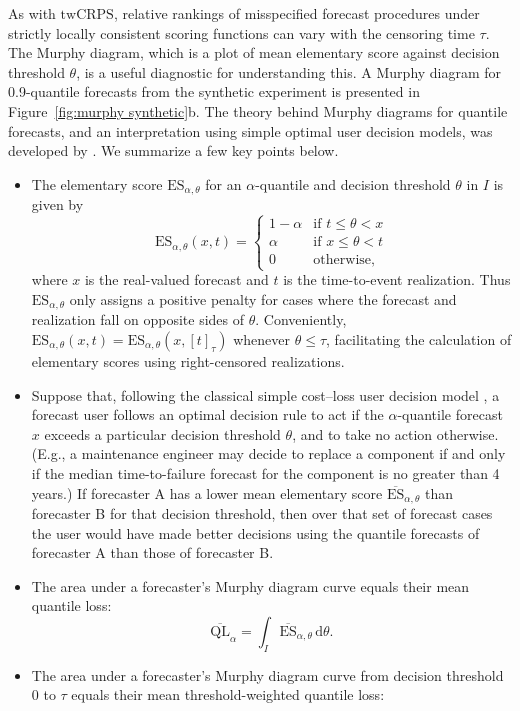 \documentclass[10pt]{article} %
\theoremstyle{theorem}
\theoremstyle{definition}
\newcommand{\dd}{\mathrm{d}}
\newcommand{\twCRPS}{\mathrm{twCRPS}}
\newcommand{\QL}{\mathrm{QL}}
\newcommand{\ES}{\mathrm{ES}}
\begin{document}
As with $\twCRPS$, relative rankings of misspecified forecast procedures under strictly locally consistent scoring functions can vary with the censoring time $\tau$. The Murphy diagram, which is a plot of mean elementary score against decision threshold $\theta$, is a useful diagnostic for understanding this. A Murphy diagram for 0.9-quantile forecasts from the synthetic experiment is presented in Figure~\ref{fig:murphy synthetic}b.
The theory behind Murphy diagrams for quantile forecasts, and an interpretation using simple optimal user decision models, was developed by \citet{ehm2016quantiles}. We summarize a few key points below.
\begin{itemize}
\item The elementary score $\ES_{\alpha,\theta}$ for an $\alpha$-quantile and decision threshold $\theta$ in $I$ is given by
\[
\ES_{\alpha,\theta}(x,t)=
\begin{cases}
1-\alpha & \text{if } t\leq\theta<x \\
\alpha & \text{if } x\leq\theta<t \\
0 & \text{otherwise,}
\end{cases}
\]
where $x$ is the real-valued forecast and $t$ is the time-to-event realization. Thus $\ES_{\alpha,\theta}$ only assigns a positive penalty for cases where the forecast and realization fall on opposite sides of $\theta$. Conveniently, $\ES_{\alpha,\theta}(x,t)=\ES_{\alpha,\theta}(x,[t]_\tau)$ whenever $\theta \leq \tau$, facilitating the calculation of elementary scores using right-censored realizations.
\item Suppose that, following the classical simple cost--loss user decision model \citep{richardson2012economic}, a forecast user follows an optimal decision rule to act if the $\alpha$-quantile forecast $x$ exceeds a particular decision threshold $\theta$, and to take no action otherwise. (E.g., a maintenance engineer may decide to replace a component if and only if the median time-to-failure forecast for the component is no greater than 4 years.) If forecaster A has a lower mean elementary score $\overline{\ES}_{\alpha,\theta}$ than forecaster B for that decision threshold, then over that set of forecast cases the user would have made better decisions using the quantile forecasts of forecaster A than those of forecaster B.
\item The area under a forecaster's Murphy diagram curve equals their mean quantile loss:
\[\overline{\QL}_\alpha = \int_I \overline{\ES}_{\alpha,\theta}\,\dd\theta.\]
\item The area under a forecaster's Murphy diagram curve from decision threshold $0$ to $\tau$ equals their mean threshold-weighted quantile loss:

\end{itemize}
\end{document}
